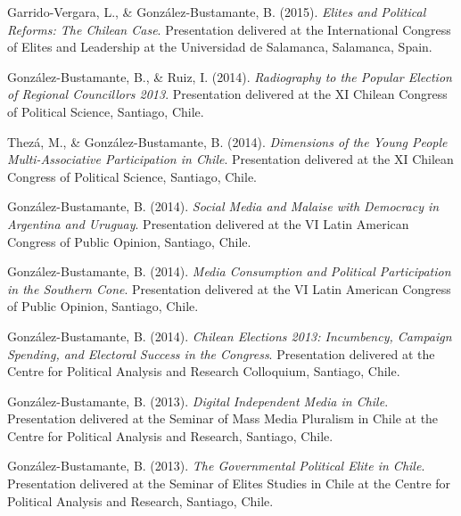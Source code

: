 \begin{publications}
\begin{benumerate}{77}
\item{\small Garrido-Vergara, L., \& González-Bustamante, B. (2015). {\itshape Elites and Political Reforms: The Chilean Case}. Presentation delivered at the International Congress of Elites and Leadership at the Universidad  de Salamanca, Salamanca, Spain.}\vspace{1mm}

\item{\small González-Bustamante, B., \& Ruiz, I. (2014). {\itshape Radiography to the Popular Election of Regional Councillors 2013}. Presentation delivered at the XI Chilean Congress of Political Science, Santiago, Chile.}\vspace{1mm}

\item{\small Thezá, M., \& González-Bustamante, B. (2014). {\itshape Dimensions of the Young People Multi-Associative Participation in Chile}. Presentation delivered at the XI Chilean Congress of Political Science, Santiago, Chile.}\vspace{1mm}

\item{\small González-Bustamante, B. (2014). {\itshape Social Media and Malaise with Democracy in Argentina and Uruguay}. Presentation delivered at the VI Latin American Congress of Public Opinion, Santiago, Chile.}\vspace{1mm}

\item{\small González-Bustamante, B. (2014). {\itshape Media Consumption and Political Participation in the Southern Cone}. Presentation delivered at the VI Latin American Congress of Public Opinion, Santiago, Chile.}\vspace{1mm}

\item{\small González-Bustamante, B. (2014). {\itshape Chilean Elections 2013: Incumbency, Campaign Spending, and Electoral Success in the Congress}. Presentation delivered at the Centre for Political Analysis and Research Colloquium, Santiago, Chile.}\vspace{1mm}

\item{\small González-Bustamante, B. (2013). {\itshape Digital Independent Media in Chile}. Presentation delivered at the Seminar of Mass Media Pluralism in Chile at the Centre for Political Analysis and Research, Santiago, Chile.}\vspace{1mm}

\item{\small González-Bustamante, B. (2013). {\itshape The Governmental Political Elite in Chile}. Presentation delivered at the Seminar of Elites Studies in Chile at the Centre for Political Analysis and Research, Santiago, Chile.}\vspace{1mm}


\end{benumerate}
\end{publications}
